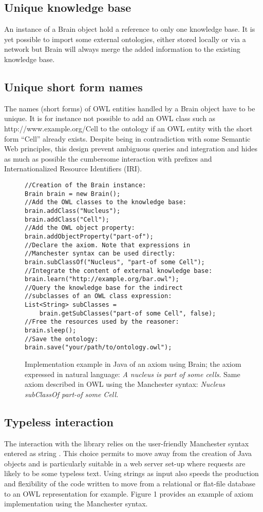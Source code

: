 \documentclass{bioinfo}
\begin{document}
\subsection{Unique knowledge base}
An instance of a Brain object hold a reference to only one knowledge base. It is yet possible to import some external ontologies, either
stored locally or via a network but Brain will always merge the added information to the existing knowledge base.
\subsection{Unique short form names}
The names (short forms) of OWL entities handled by a Brain object have to be unique. It is for instance not possible to add
an OWL class such as http://www.example.org/Cell to the ontology if an OWL entity with the short form ``Cell'' already exists.
Despite being in contradiction with some Semantic Web principles, this design prevent ambiguous queries and integration
and hides as much as possible the cumbersome interaction with prefixes and Internationalized Resource Identifiers (IRI).

\begin{figure}[h]
\begingroup
\fontsize{7pt}{8pt}\selectfont
\begin{Verbatim}[frame=single]
//Creation of the Brain instance:
Brain brain = new Brain();
//Add the OWL classes to the knowledge base:
brain.addClass("Nucleus");
brain.addClass("Cell");
//Add the OWL object property:
brain.addObjectProperty("part-of");
//Declare the axiom. Note that expressions in 
//Manchester syntax can be used directly:
brain.subClassOf("Nucleus", "part-of some Cell");
//Integrate the content of external knowledge base:
brain.learn("http://example.org/bar.owl");
//Query the knowledge base for the indirect
//subclasses of an OWL class expression:
List<String> subClasses = 
    brain.getSubClasses("part-of some Cell", false);
//Free the resources used by the reasoner:
brain.sleep();
//Save the ontology:
brain.save("your/path/to/ontology.owl");
\end{Verbatim}
\endgroup
\caption{Implementation example in Java of an axiom using Brain; the axiom expressed in natural language:
 \textit{A nucleus is part of some cells}. Same axiom described in OWL using the Manchester syntax: 
 \textit{Nucleus subClassOf part-of some Cell.}}
\end{figure}

\subsection{Typeless interaction}
The interaction with the library relies on the user-friendly Manchester syntax entered as string \citep{Horridge2006}. 
This choice permits to move away from the creation of Java objects and is particularly suitable in a web server set-up where
requests are likely to be some typeless text. Using strings as input also speeds the production
and flexibility of the code written to move from a relational or flat-file database to an OWL representation for example. Figure 1 provides
an example of axiom implementation using the Manchester syntax.
\end{document}
